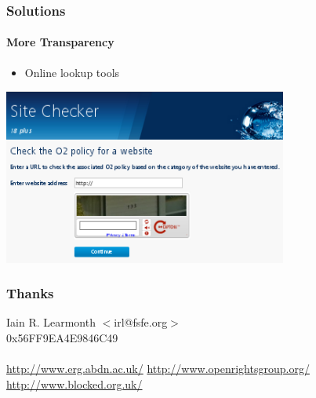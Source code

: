 \documentclass{beamer}
\begin{document}
\begin{frame}
	\frametitle{Solutions}
	\framesubtitle{More Transparency}
	\begin{itemize}
		\item{Online lookup tools}
	\end{itemize}
	\begin{center}
		\includegraphics[width=0.7\textwidth]{o2checker.png}
	\end{center}
\end{frame}

\begin{frame}
	\frametitle{Thanks}
	\begin{center}
		{\LARGE Iain R. Learmonth $<$irl@fsfe.org$>$ \\ 0x56FF9EA4E9846C49}
		\ \\ \ \\
		{\LARGE \url{http://www.erg.abdn.ac.uk/}}
		{\LARGE \url{http://www.openrightsgroup.org/}}
		{\LARGE \url{http://www.blocked.org.uk/}}
	\end{center}
\end{frame}
\end{document}
